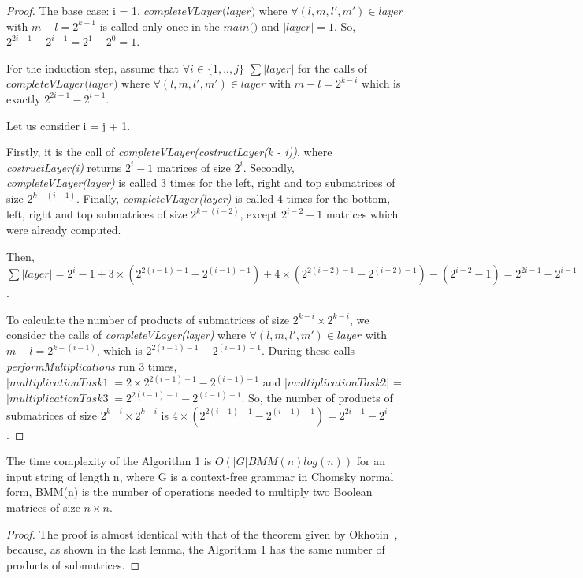 \documentclass[runningheads]{llncs}
\begin{document}
\begin{proof}
The base case: i = 1. $\textit{completeVLayer(layer)}$ where $\forall (l, m, l', m') \in layer$ with $m - l = 2^{k - 1}$ is called only once in the  $\textit{main()}$ and $|layer| = 1$. So, $2^{2i - 1} - 2^{i - 1} = 2^1 - 2^0 = 1$.

For the induction step, assume that $\forall i \in \{ 1, .., j\}$ $\sum{|layer|}$ for the calls of $\textit{completeVLayer(layer)}$ where $\forall (l, m, l', m') \in layer$ with $m - l = 2^{k - i}$  which is exactly $2^{2i - 1} - 2^{i - 1}$.

Let us consider i = j + 1. 

Firstly, it is the call of \textit{completeVLayer(costructLayer(k - i))}, where \textit{costructLayer(i)} returns $2^i - 1$ matrices of size $2^i$. Secondly, \textit{completeVLayer(layer)} is called 3 times for the left, right and top submatrices of size $2^{k - (i - 1)}$. Finally, \textit{completeVLayer(layer)} is called 4 times for the bottom, left, right and top submatrices of size $2^{k - (i - 2)}$, except $2^{i - 2} - 1$ matrices which were already computed.

Then, $\sum{|layer|} = 2^{i} - 1 + 3 \times (2^{2(i - 1) - 1} - 2^{(i - 1) - 1}) + 4 \times (2^{2(i - 2) - 1} - 2^{(i - 2) - 1}) - (2^{i - 2} - 1) = 2^{2i - 1} - 2^{i - 1}$. 

To calculate the number of products of submatrices of size $2^{k - i} \times 2^{k - i}$, we consider the calls of \textit{completeVLayer(layer)} where $\forall (l, m, l', m') \in layer$ with $m - l = 2^{k - (i - 1)}$, which is $2^{2(i - 1) - 1} - 2^{(i - 1) - 1}$. During these calls \textit{performMultiplications} run 3 times, $|multiplicationTask1| = 2 \times 2^{2(i - 1) - 1} - 2^{(i - 1) - 1}$ and \linebreak $|multiplicationTask2|$ = $|multiplicationTask3| = 2^{2(i - 1) - 1} - 2^{(i - 1) - 1}$. So, the number of products of submatrices of size $2^{k - i} \times 2^{k - i}$ is $4 \times (2^{2(i - 1) - 1} - 2^{(i - 1) - 1}) = 2^{2i - 1} - 2^{i}$.
\end{proof}

\begin{theorem}
The time complexity of the Algorithm 1 is $O(|G|BMM(n)log(n))$ for an input string of length n, where G is a context-free grammar in Chomsky normal form, BMM(n) is the number of operations needed to multiply two Boolean matrices of size $n \times n$.
\end{theorem}

\begin{proof}
The proof is almost identical with that of the theorem given by Okhotin~\cite{okhotin}, because, as shown in the last lemma, the Algorithm 1 has the same number of products of submatrices.
\end{proof}
\end{document}
